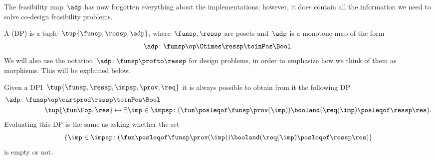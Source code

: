 The feasibility map~$\adp$ has now forgotten everything about the implementations; however, it does contain all the information we need to solve co-design feasibility problems.

\begin{definition}
	\label{def:design-problem}
	A  (DP) is a tuple~$\tup{\funsp, \ressp, \adp}$, where~$\funsp, \ressp$ are posets and~$\adp$ is a monotone map of the form%
	\begin{equation*}
		\label{eq:design_prob_as_monfun}
		\adp \colon  \funsp\op \Ctimes \ressp \toinPos \Bool.
	\end{equation*}
	We will also use the notation~$\adp \colon \funsp \profto \ressp$ for design problems, in order to emphasize how we think of them as morphisms.
	This will be explained below.
\end{definition}

\begin{remark}
	Given a DPI~$\tup{\funsp, \ressp, \impsp, \prov,\req}$ it is always possible to obtain from it the following DP
	\begin{equation}
		\label{eq:dpi_to_dp_1}
		\begin{aligned}
			\adp\colon \funsp\op \cartprod \ressp & \toinPos  \Bool                                                                                                      \\
			\tup{\fun\Fop,\res}                   & \mapsto \exists \imp \in \impsp \colon (\fun \posleqof\funsp \prov(\imp)) \booland (\req(\imp)\posleqof\ressp \res).
		\end{aligned}
	\end{equation}
	Evaluating this DP is the same as asking whether the set
	\begin{equation}
		\label{eq:dpi_to_dp_2}
		\{ \imp \in \impsp \colon (\fun \posleqof\funsp \prov(\imp)) \booland (\req(\imp)\posleqof\ressp \res)\}
	\end{equation}
	is empty or not.
\end{remark}

